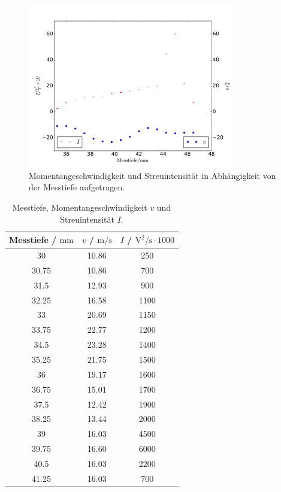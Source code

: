 \documentclass[
  bibliography=totoc,     %
  captions=tableheading,  %
  titlepage=firstiscover, %
]{scrartcl}
\begin{document}
      \begin{figure}
        \centering
        \includegraphics[width=0.8\textwidth]{b70.pdf}
        \caption{Momentangeschwindigkeit und Streuintensität in Abhängigkeit
        von der Messtiefe aufgetragen.}
        \label{fig:5}
      \end{figure}
      \begin{table}
        \centering
        \begin{tabular}{c c c}
          \toprule
          Messtiefe / $\si{\meter\meter}$ & $v$ / $\si{\meter\per\second}$ &
          $I$ / $\si{\volt\squared\per\second} \cdot 1000$ \\
          \midrule
          30 & 10.86 & 250 \\
          30.75 & 10.86 & 700 \\
          31.5 & 12.93 & 900 \\
          32.25 & 16.58 & 1100 \\
          33 & 20.69 & 1150 \\
          33.75 & 22.77 & 1200 \\
          34.5 & 23.28 & 1400 \\
          35.25 & 21.75 & 1500 \\
          36 & 19.17 & 1600 \\
          36.75 & 15.01 & 1700 \\
          37.5 & 12.42 & 1900 \\
          38.25 & 13.44 & 2000 \\
          39 & 16.03 & 4500 \\
          39.75 & 16.60 & 6000 \\
          40.5 & 16.03 & 2200 \\
          41.25 & 16.03 & 700 \\
          \bottomrule
        \end{tabular}
        \caption{Messtiefe, Momentangeschwindigkeit $v$ und Streuintensität $I$.}
        \label{tab:6}
      \end{table}
\end{document}

